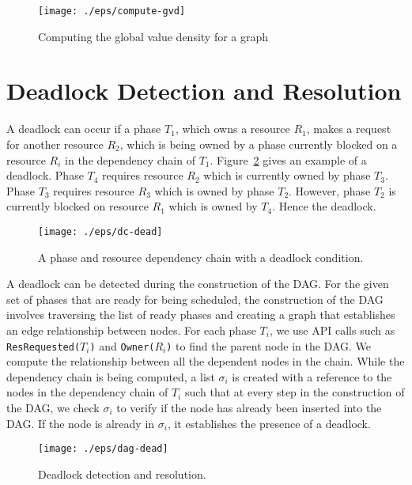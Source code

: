 \documentclass[12pt,dvips]{report}
\begin{document}
\begin{figure} [htpb]
  \centering
  \texttt{[image: ./eps/compute-gvd]}
  \caption{Computing the global value density for a graph}
  \label{fig:compute-gvd}
\end{figure}

\section{Deadlock Detection and Resolution}\label{algo:dead}

A deadlock can occur if a phase $T_1$, which owns a resource $R_1$, makes a request for another resource $R_2$, which is being owned by a phase currently blocked on a resource $R_i$ in the dependency chain of $T_1$. Figure~\ref{fig:dcdead} gives an example of a deadlock. Phase $T_4$ requires resource $R_2$ which is currently owned by phase $T_3$. Phase $T_3$ requires resource $R_3$ which is owned by phase $T_2$. However, phase $T_2$ is currently blocked on resource $R_1$ which is owned by $T_4$. Hence the deadlock.

\begin{figure} [htpb]
  \centering
  \texttt{[image: ./eps/dc-dead]}  
  \caption{A phase and resource dependency chain with a deadlock condition.}
  \label{fig:dcdead}
\end{figure}

A deadlock can be detected during the construction of the DAG. For the given set of phases that are ready for being scheduled, the construction of the DAG involves traversing the list of ready phases and creating a graph that establishes an edge relationship between nodes. For each phase $T_i$, we use API calls such as \texttt{ResRequested($T_i$)} and \texttt{Owner($R_i$)} to find the parent node in the DAG. We compute the relationship between all the dependent nodes in the chain. While the dependency chain is being computed, a list $\sigma_i$ is created with a reference to the nodes in the dependency chain of $T_i$ such that at every step in the construction of the DAG, we check $\sigma_i$ to verify if the node has already been inserted into the DAG. If the node is already in $\sigma_i$, it establishes the presence of a deadlock.

\begin{figure} [htbp]
  \centering
  \texttt{[image: ./eps/dag-dead]}  
  \caption{Deadlock detection and resolution.}
  \label{fig:dagdead}
\end{figure}
\end{document}
